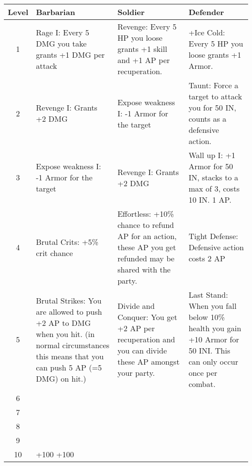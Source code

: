 \begin{longtable}{ c p{4cm} p{4cm} p{4cm} }

Level & Barbarian & Soldier & Defender \\
 \hline
1 &  
Rage I: Every 5 DMG you take grants +1 DMG per attack &
Revenge: Every 5 HP you loose grants +1 skill and +1 AP per recuperation. &
+Ice Cold: Every 5 HP you loose grants +1 Armor. \\

2 &
Revenge I: Grants +2 DMG &
Expose weakness I: -1 Armor for the target &
Taunt: Force a target to attack you for 50 IN, counts as a defensive action. \\
 
3 &
Expose weakness I: -1 Armor for the target &
Revenge I: Grants +2 DMG &
Wall up I: +1 Armor for 50 IN, stacks to a max of 3, costs 10 IN. 1 AP. \\
 
4 &
Brutal Crits: +5\% crit chance  &
Effortless: +10\% chance to refund AP for an action, these AP you get refunded may be shared with the party. &
Tight Defense: Defensive action costs 2 AP \\
 
5 &
Brutal Strikes: You are allowed to push +2 AP to DMG when you hit. (in normal circumstances this means that you can push 5 AP (=5 DMG) on hit.) &
Divide and Conquer: You get +2 AP per recuperation and you can divide these AP amongst your party. &
Last Stand: When you fall below 10\% health you gain +10 Armor for 50 INI. This can only occur once per combat.\\
 
6 &
 &
 &
 \\
 
7 &
 &
 &
 \\

8 &
 &
 &
 \\
 
9 &
 &
 &
 \\
 
10 &
+100%
+100%
 \\


\end{longtable}